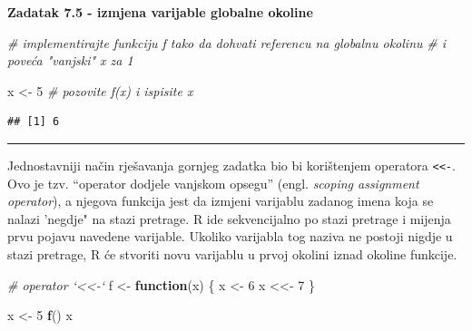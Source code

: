 \documentclass[]{book}
\newenvironment{Shaded}{\begin{snugshade}}{\end{snugshade}}
\newcommand{\KeywordTok}[1]{\textcolor[rgb]{0.13,0.29,0.53}{\textbf{#1}}}
\newcommand{\DecValTok}[1]{\textcolor[rgb]{0.00,0.00,0.81}{#1}}
\newcommand{\StringTok}[1]{\textcolor[rgb]{0.31,0.60,0.02}{#1}}
\newcommand{\CommentTok}[1]{\textcolor[rgb]{0.56,0.35,0.01}{\textit{#1}}}
\newcommand{\ControlFlowTok}[1]{\textcolor[rgb]{0.13,0.29,0.53}{\textbf{#1}}}
\newcommand{\OperatorTok}[1]{\textcolor[rgb]{0.81,0.36,0.00}{\textbf{#1}}}
\newcommand{\NormalTok}[1]{#1}
\theoremstyle{definition}
\theoremstyle{definition}
\theoremstyle{definition}
\theoremstyle{remark}
\begin{document}
\textbf{Zadatak 7.5 - izmjena varijable globalne okoline}

\begin{Shaded}
\begin{Highlighting}[]
\CommentTok{# implementirajte funkciju f tako da dohvati referencu na globalnu okolinu }
\CommentTok{# i poveća "vanjski" x za 1}

\NormalTok{x <-}\StringTok{ }\DecValTok{5}
\CommentTok{# pozovite f(x) i ispisite x}
\end{Highlighting}
\end{Shaded}

\begin{Shaded}
\end{Shaded}

\begin{verbatim}
## [1] 6
\end{verbatim}

\begin{center}\rule{0.5\linewidth}{\linethickness}\end{center}

Jednostavniji način rješavanja gornjeg zadatka bio bi korištenjem
operatora \texttt{\textless{}\textless{}-}. Ovo je tzv. ``operator
dodjele vanjskom opsegu'' (engl. \emph{scoping assignment operator}), a
njegova funkcija jest da izmjeni varijablu zadanog imena koja se nalazi
'negdje" na stazi pretrage. R ide sekvencijalno po stazi pretrage i
mijenja prvu pojavu navedene varijable. Ukoliko varijabla tog naziva ne
postoji nigdje u stazi pretrage, R će stvoriti novu varijablu u prvoj
okolini iznad okoline funkcije.

\begin{Shaded}
\begin{Highlighting}[]
\CommentTok{# operator `<<-`}
\NormalTok{f <-}\StringTok{ }\ControlFlowTok{function}\NormalTok{(x) \{}
\NormalTok{    x <-}\StringTok{ }\DecValTok{6}
\NormalTok{    x <<-}\StringTok{ }\DecValTok{7}
\NormalTok{\}}

\NormalTok{x <-}\StringTok{ }\DecValTok{5}
\KeywordTok{f}\NormalTok{()}
\NormalTok{x}
\end{Highlighting}
\end{Shaded}
\end{document}
